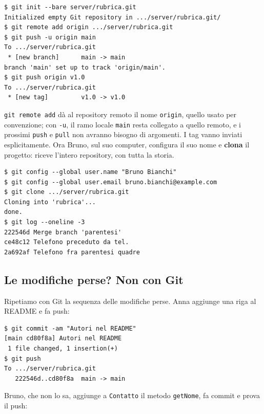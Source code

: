 \begin{lstlisting}[style=shell, name=Terminale di Anna, deletestring={[b]'}, deletekeywords={java}]
$ git init --bare server/rubrica.git
Initialized empty Git repository in .../server/rubrica.git/
$ git remote add origin .../server/rubrica.git
$ git push -u origin main
To .../server/rubrica.git
 * [new branch]      main -> main
branch 'main' set up to track 'origin/main'.
$ git push origin v1.0
To .../server/rubrica.git
 * [new tag]         v1.0 -> v1.0
\end{lstlisting}

\texttt{git remote add} dà al repository remoto il nome \texttt{origin}, quello usato per convenzione; con
\texttt{-u}, il ramo locale \texttt{main} resta collegato a quello remoto, e i prossimi \texttt{push} e \texttt{pull} non
avranno bisogno di argomenti. I tag vanno inviati esplicitamente. Ora Bruno, sul suo computer, configura il suo nome e
\textbf{clona} il progetto: riceve l'intero repository, con tutta la storia.

\begin{lstlisting}[style=shell, name=Terminale di Bruno, deletestring={[b]'}, deletekeywords={java}]
$ git config --global user.name "Bruno Bianchi"
$ git config --global user.email bruno.bianchi@example.com
$ git clone .../server/rubrica.git
Cloning into 'rubrica'...
done.
$ git log --oneline -3
222546d Merge branch 'parentesi'
ce48c12 Telefono preceduto da tel.
2a692af Telefono fra parentesi quadre
\end{lstlisting}

\subsection{Le modifiche perse? Non con Git}

Ripetiamo con Git la sequenza delle modifiche perse. Anna aggiunge una riga al README e fa push:

\begin{lstlisting}[style=shell, name=Terminale di Anna, deletekeywords={java}]
$ git commit -am "Autori nel README"
[main cd80f8a] Autori nel README
 1 file changed, 1 insertion(+)
$ git push
To .../server/rubrica.git
   222546d..cd80f8a  main -> main
\end{lstlisting}

Bruno, che non lo sa, aggiunge a \texttt{Contatto} il metodo \texttt{getNome}, fa commit e prova il push:

